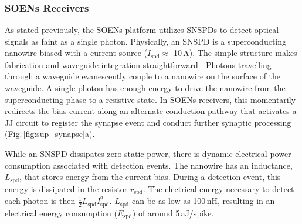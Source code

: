 \documentclass[twocolumn]{article}
\begin{document}
\subsubsection{SOENs Receivers}
As stated previously, the SOENs platform utilizes SNSPDs to detect optical signals as faint as a single photon. Physically, an SNSPD is a superconducting nanowire biased with a current source ($I_{\mathrm{spd}} \approx$ 10\,\textmu A). The simple structure makes fabrication and waveguide integration straightforward \cite{spga2011,pesc2012,akhlaghi2015waveguide,feka2015,saga2015,shbu2017b,ferrari2018waveguide,buta2020}. Photons travelling through a waveguide evanescently couple to a nanowire on the surface of the waveguide. A single photon has enough energy to drive the nanowire from the superconducting phase to a resistive state. In SOENs receivers, this momentarily redirects the bias current along an alternate conduction pathway that activates a JJ circuit to register the synapse event and conduct further synaptic processing (Fig.\,\ref{fig:sup_synapse}a).

While an SNSPD dissipates zero static power, there is dynamic electrical power consumption associated with detection events. The nanowire has an inductance, $L_{\mathrm{spd}}$, that stores energy from the current bias. During a detection event, this energy is dissipated in the resistor $r_{\mathrm{spd}}$. The electrical energy necessary to detect each photon is then $\frac{1}{2}L_{\mathrm{spd}}I_{\mathrm{spd}}^2$. $L_{\mathrm{spd}}$ can be as low as 100\,nH, resulting in an electrical energy consumption ($E_{\mathrm{spd}}$) of around 5\,aJ/spike.
\end{document}
